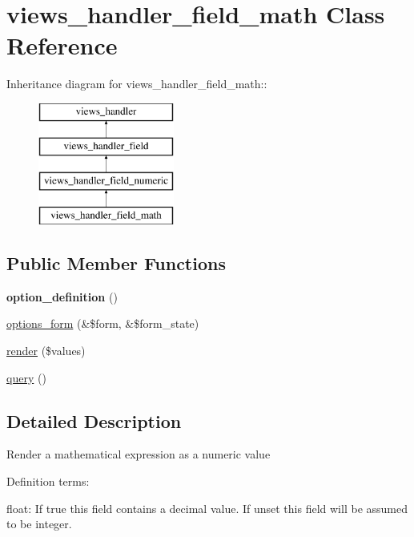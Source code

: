 \hypertarget{classviews__handler__field__math}{
\section{views\_\-handler\_\-field\_\-math Class Reference}
\label{classviews__handler__field__math}
}
Inheritance diagram for views\_\-handler\_\-field\_\-math::\begin{figure}[H]
\begin{center}
\leavevmode
\includegraphics[height=4cm]{classviews__handler__field__math}
\end{center}
\end{figure}
\subsection*{Public Member Functions}
\begin{DoxyCompactItemize}
\item 
\hypertarget{classviews__handler__field__math_a8682ebb49b51726501ebcd94c603dd80}{
{\bfseries option\_\-definition} ()}
\label{classviews__handler__field__math_a8682ebb49b51726501ebcd94c603dd80}

\item 
\hyperlink{classviews__handler__field__math_a0a1d90a724d24fc1ae096413749aba05}{options\_\-form} (\&\$form, \&\$form\_\-state)
\item 
\hyperlink{classviews__handler__field__math_a2d3ecd4f87873d06e47f9debabd78801}{render} (\$values)
\item 
\hyperlink{classviews__handler__field__math_a2a7e7e461f4790e2d5cad0d2ea7651d1}{query} ()
\end{DoxyCompactItemize}


\subsection{Detailed Description}
Render a mathematical expression as a numeric value

Definition terms:
\begin{DoxyItemize}
\item float: If true this field contains a decimal value. If unset this field will be assumed to be integer. 
\end{DoxyItemize}

